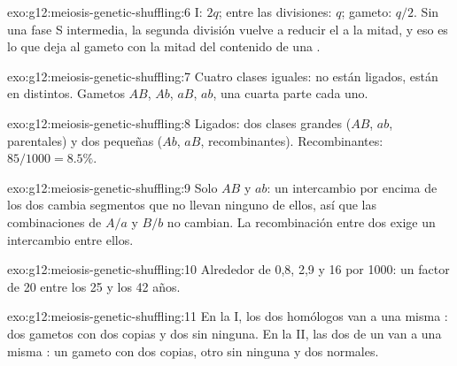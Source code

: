 \begin{solution}{exo:g12:meiosis-genetic-shuffling:6}
 I: $2q$; entre las divisiones: $q$; gameto: $q/2$. Sin una fase
S intermedia, la segunda división vuelve a reducir el  a la mitad, y
eso es lo que deja al gameto con la mitad del contenido de una 
.
\end{solution}

\begin{solution}{exo:g12:meiosis-genetic-shuffling:7}
Cuatro clases iguales: no están ligados, están en  distintos.
Gametos $AB$, $Ab$, $aB$, $ab$, una cuarta parte cada uno.
\end{solution}

\begin{solution}{exo:g12:meiosis-genetic-shuffling:8}
Ligados: dos clases grandes ($AB$, $ab$, parentales) y dos pequeñas
($Ab$, $aB$, recombinantes). Recombinantes: $85/1000 = 8.5\%$.
\end{solution}

\begin{solution}{exo:g12:meiosis-genetic-shuffling:9}
Solo $AB$ y $ab$: un intercambio por encima de los dos  cambia
segmentos que no llevan ninguno de ellos, así que las combinaciones de
$A/a$ y $B/b$ no cambian. La recombinación entre dos  exige un
intercambio entre ellos.
\end{solution}

\begin{solution}{exo:g12:meiosis-genetic-shuffling:10}
Alrededor de 0,8, 2,9 y 16 por 1000: un factor de 20 entre los 25 y
los 42 años.
\end{solution}

\begin{solution}{exo:g12:meiosis-genetic-shuffling:11}
En la  I, los dos homólogos van a una misma : dos gametos
con dos copias y dos sin ninguna. En la  II, las dos 
de un  van a una misma : un gameto con dos copias, otro
sin ninguna y dos normales.
\end{solution}

